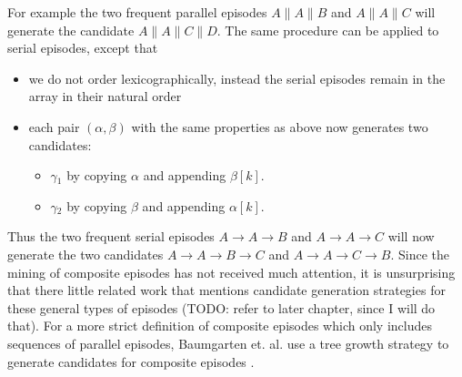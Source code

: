 For example the two frequent parallel episodes $A \| A \| B$ and $A \| A \| C$ will generate the candidate $A \| A \| C \| D$. \newline
The same procedure can be applied to serial episodes, except that
\begin{itemize}
	\item we do not order lexicographically, instead the serial episodes remain in the array in their natural order
	\item each pair $(\alpha , \beta )$ with the same properties as above now generates two candidates:
	\begin{itemize}
		\item $\gamma{_1}$ by copying $\alpha$ and appending $\beta [k]$.
		\item $\gamma{_2}$ by copying $\beta$ and appending $\alpha [k]$.
	\end{itemize}
\end{itemize}

Thus the two frequent serial episodes $A \rightarrow A \rightarrow B$ and $A \rightarrow A \rightarrow C$ will now generate the two candidates $A \rightarrow A \rightarrow B \rightarrow C$ and $A \rightarrow A \rightarrow C \rightarrow B$. \newline
Since the mining of composite episodes has not received much attention, it is unsurprising that there little related work that mentions candidate generation strategies for these general types of episodes (TODO: refer to later chapter, since I will do that). For a more strict definition of composite episodes which only includes sequences of parallel episodes, Baumgarten et. al. use a tree growth strategy to generate candidates for composite episodes \cite{baumgarten2003tree}. %







